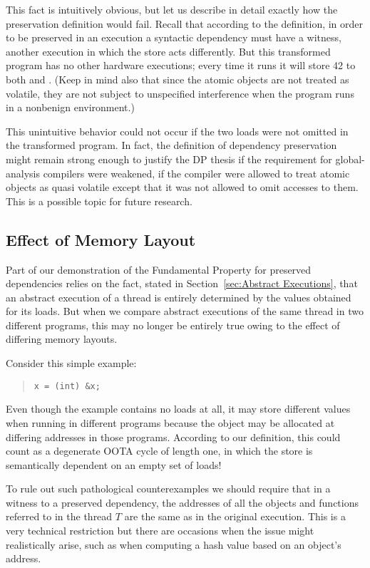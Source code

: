 This fact is intuitively obvious, but let us describe in detail
exactly how the preservation definition would fail.
Recall that according to the definition, in order to be preserved in an execution
a syntactic dependency must have a witness,
another execution in which the store acts differently.
But this transformed program has no other hardware executions; every time it
runs it will store 42 to both  and .
(Keep in mind also that since the atomic objects are not treated as
volatile, they are not subject to unspecified interference when the
program runs in a nonbenign environment.)

This unintuitive behavior could not occur if the two loads were not
omitted in the transformed program.
In fact, the definition of dependency preservation might remain
strong enough to justify the DP thesis
if the requirement for global-analysis compilers
were weakened, if the compiler were allowed to treat atomic objects as
quasi volatile except that it was not allowed to omit accesses to them.
This is a possible topic for future research.

\subsection{Effect of Memory Layout}
\label{sec:Effect of Memory Layout}

Part of our demonstration of the Fundamental Property for preserved
dependencies relies on the fact, stated in
Section~\ref{sec:Abstract Executions},
that an abstract execution of a thread is entirely determined by the
values obtained for its loads.
But when we compare abstract executions of the same thread in two
different programs, this may no longer be entirely true owing to the
effect of differing memory layouts.

Consider this simple example:
\begin{quote}
\begin{verbatim}
x = (int) &x;
\end{verbatim}
\end{quote}
Even though the example contains no loads at all, it may store
different values when running in different programs because the
object  may be allocated at differing addresses in those
programs.
According to our definition, this could count as a degenerate OOTA
cycle of length one, in which the store is semantically dependent on
an empty set of loads!

To rule out such pathological counterexamples we should require that
in a witness to a preserved dependency, the addresses of all the
objects and functions referred to in the thread $T$ are the same as
in the original execution.
This is a very technical restriction but there are occasions when
the issue might realistically arise, such as when computing a hash
value based on an object's address.

